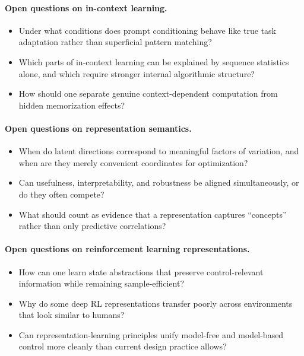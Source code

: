 \paragraph{Open questions on in-context learning.}
\begin{itemize}
    \item Under what conditions does prompt conditioning behave like true task adaptation rather than superficial pattern matching?
    \item Which parts of in-context learning can be explained by sequence statistics alone, and which require stronger internal algorithmic structure?
    \item How should one separate genuine context-dependent computation from hidden memorization effects?
\end{itemize}

\paragraph{Open questions on representation semantics.}
\begin{itemize}
    \item When do latent directions correspond to meaningful factors of variation, and when are they merely convenient coordinates for optimization?
    \item Can usefulness, interpretability, and robustness be aligned simultaneously, or do they often compete?
    \item What should count as evidence that a representation captures ``concepts'' rather than only predictive correlations?
\end{itemize}

\paragraph{Open questions on reinforcement learning representations.}
\begin{itemize}
    \item How can one learn state abstractions that preserve control-relevant information while remaining sample-efficient?
    \item Why do some deep RL representations transfer poorly across environments that look similar to humans?
    \item Can representation-learning principles unify model-free and model-based control more cleanly than current design practice allows?
\end{itemize}

